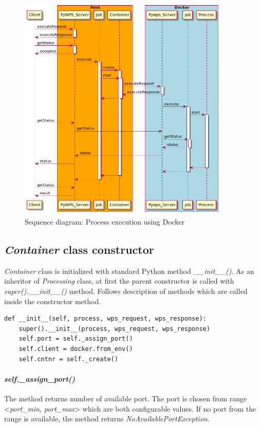 \documentclass[12pt,a4paper]{article}
\begin{document}
\bigskip
\begin{figure}[h!]
\centering
\includegraphics[width=0.9\textwidth]{img/Diag_sequence.png}
\caption{Sequence diagram: Process execution using Docker}
\label{fig:Diag_sequence}
\end{figure}

\subsection{\textit{Container} class constructor}
\label{sub:Container_init}
\textit{Container} class is initialized with standard Python method \textit{\_\_init\_\_()}. As an inheritor of \textit{Processing}
class, at first the parent constructor is called with \textit{super().\_\_init\_\_()} method. Follows description of methods which are
called inside the constructor method.

\bigskip
\begin{lstlisting}[basicstyle=\small,caption={\textit{Container} class constructor},label={lst:Container_constructor}]
def __init__(self, process, wps_request, wps_response):
    super().__init__(process, wps_request, wps_response)
    self.port = self._assign_port()
    self.client = docker.from_env()
    self.cntnr = self._create()
\end{lstlisting}

\paragraph{\textit{self.\_assign\_port()}} The method returns number of available port. The port is chosen from range <\textit{port\_min},
\textit{port\_max}> which are both configurable values. If no port from the range is available, the method returns
\textit{NoAvailablePortException}. 
\end{document}
